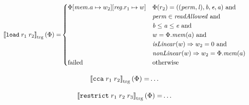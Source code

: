 \documentclass[a4paper]{article}
\newcommand{\sem}[1]{\left\llbracket #1 \right\rrbracket}
\newcommand{\tsem}[2][\Phi]{\sem{#2}_{\mathrm{trg}}(#1)}
\newcommand{\tand}{\text{ and }}
\newcommand{\totherwise}{\text{otherwise }}
\newcommand{\targetcolor}[1]{\color{black}}
\newcommand{\trg}[1]{{\targetcolor{} #1}}
\newcommand{\zinstr}[1]{\texttt{#1}}
\newcommand{\twoinstr}[3]{
  \ifthenelse{\equal{#2#3}{}}
  {\zinstr{#1}}
  {\zinstr{#1} \; #2 \; #3}
}
\newcommand{\threeinstr}[4]{
  \ifthenelse{\equal{#2#3#4}{}}
  {\zinstr{#1}}
  {\zinstr{#1} \; #2 \; #3 \; #4}
}
\newcommand{\tload}[2]{\twoinstr{\trg{load}}{#1}{#2}}
\newcommand{\tcca}[2]{\twoinstr{\trg{cca}}{#1}{#2}}
\newcommand{\trestrict}[3]{\threeinstr{\trg{restrict}}{#1}{#2}{#3}}
\newcommand{\update}[2]{[#1 \mapsto #2]}
\newcommand{\updReg}[2]{\update{\reg.#1}{#2}}
\newcommand{\perm}{\var{perm}}
\newcommand{\lin}{\var{l}}
\newcommand{\failed}{\mathrm{failed}}
\newcommand{\var}[1]{\mathit{#1}}
\newcommand{\reg}{\var{reg}}
\newcommand{\mem}{\var{mem}}
\newcommand{\baddr}{\var{b}}
\newcommand{\eaddr}{\var{e}}
\newcommand{\aaddr}{\var{a}}
\newcommand{\plainfun}[2]{
  \ifthenelse{\equal{#2}{}}
  {\mathit{#1}}
  {\mathit{#1}(#2)}
}
\newcommand{\readAllowed}[1]{\plainfun{readAllowed}{#1}}
\newcommand{\nonLinear}[1]{\plainfun{nonLinear}{#1}}
\newcommand{\isLinear}[1]{\plainfun{isLinear}{#1}}
\begin{document}
\begin{align*}
  \tsem{\tload{r_1}{r_2}} = & 
                              \begin{cases}
                                \Phi\update{\mem.a}{w_2}\updReg{r_1}{w} &
                                \arraycolsep=0pt
                                \begin{array}[t]{l}
                                  \Phi(r_2) = ((\perm,\lin),\baddr,\eaddr,\aaddr) \tand \\
                                  \perm \in \readAllowed{} \tand \\
                                  \baddr \leq \aaddr \leq \eaddr \tand \\
                                  w = \Phi.\mem(a) \tand \\
                                  \isLinear{w} \Rightarrow w_2 = 0 \tand \\
                                  \nonLinear{w} \Rightarrow w_2 = \Phi.\mem(a)
                                \end{array} \\
                                \failed & \totherwise
                              \end{cases}
\end{align*}

\begin{align*}
  \tsem{\tcca{r_1}{r_2}} = & \dots
\end{align*}

\begin{align*}
  \tsem{\trestrict{r_1}{r_2}{r_3}} = & \dots
\end{align*}
\end{document}
